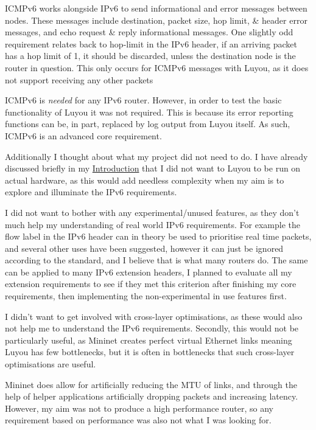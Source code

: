 \documentclass[12pt,a4paper,twoside,openright]{report}
\begin{document}
\bigskip

ICMPv6 works alongside IPv6 to send informational and error messages between nodes.  These messages include destination, packet size, hop limit, \& header error messages, and echo request \& reply informational messages. One slightly odd requirement relates back to hop-limit in the IPv6 header, if an arriving packet has a hop limit of 1, it should be discarded, unless the destination node is the router in question.  This only occurs for ICMPv6 messages with Luyou, as it does not support receiving any other packets

ICMPv6 is \textit{needed} for any IPv6 router.  However, in order to test the basic functionality of Luyou it was not required. This is because its error reporting functions can be, in part, replaced by log output from Luyou itself. As such, ICMPv6 is an advanced core requirement.

\bigskip

Additionally I thought about what my project did not need to do. I have already discussed briefly in my \hyperref[chap::introduction]{Introduction} that I did not want to Luyou to be run on actual hardware, as this would add needless complexity when my aim is to explore and illuminate the IPv6 requirements. 

I did not want to bother with any experimental/unused features, as they don't much help my understanding of real world IPv6 requirements. For example the flow label in the IPv6 header can in theory be used to prioritise real time packets, and several other uses have been suggested, however it can just be ignored according to the standard, and I believe that is what many routers do.  The same can be applied to many IPv6 extension headers, I planned to evaluate all my extension requirements to see if they met this criterion after finishing my core requirements, then implementing the non-experimental in use features first.

I didn't want to get involved with cross-layer optimisations, as these would also not help me to understand the IPv6 requirements.  Secondly, this would not be particularly useful, as Mininet creates perfect virtual Ethernet links meaning Luyou has few bottlenecks, but it is often in bottlenecks that such cross-layer optimisations are useful.

Mininet does allow for artificially reducing the MTU of links, and through the help of helper applications artificially dropping packets and increasing latency.  However, my aim was not to produce a high performance router, so any requirement based on performance was also not what I was looking for.
\end{document}
